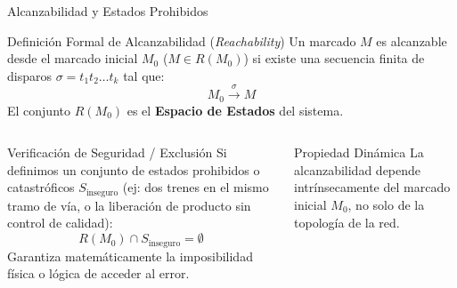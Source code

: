 \documentclass[10pt, aspectratio=169]{beamer}
\begin{document}
\begin{frame}{Alcanzabilidad y Estados Prohibidos}
	\begin{block}{Definición Formal de Alcanzabilidad (\emph{Reachability})}
		Un marcado $M$ es alcanzable desde el marcado inicial $M_0$ ($M \in R(M_0)$) si existe una secuencia finita de disparos $\sigma = t_1 t_2 \dots t_k$ tal que:
		\[ M_0 \xrightarrow{\;\sigma\;} M \]
		El conjunto $R(M_0)$ es el \textbf{Espacio de Estados} del sistema.
	\end{block}

	\begin{columns}
		\begin{alertblock}{Verificación de Seguridad / Exclusión}
			Si definimos un conjunto de estados prohibidos o catastróficos $S_{\text{inseguro}}$ (ej: dos trenes en el mismo tramo de vía, o la liberación de producto sin control de calidad):
			\[ R(M_0) \cap S_{\text{inseguro}} = \emptyset \]
			Garantiza matemáticamente la imposibilidad física o lógica de acceder al error.
		\end{alertblock}

		\begin{exampleblock}{Propiedad Dinámica}
			La alcanzabilidad depende intrínsecamente del marcado inicial $M_0$, no solo de la topología de la red.
		\end{exampleblock}
	\end{columns}
\end{frame}
\end{document}
